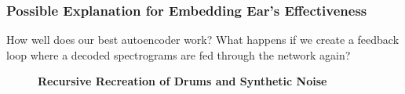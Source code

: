 \documentclass[\main/thesis.tex]{subfiles}
\begin{document}
\subsubsection{Possible Explanation for Embedding Ear's Effectiveness}
How well does our best autoencoder work? What happens if we create a feedback loop where a decoded spectrograms are fed through the network again? 
\begin{figure}[h!]
\centering
\textbf{Recursive Recreation of Drums and Synthetic Noise}\par\medskip
{}
\end{figure}
\end{document}
